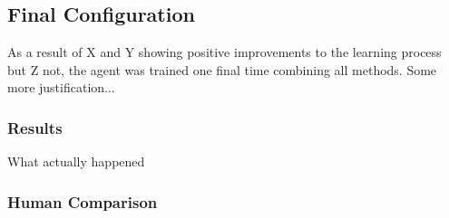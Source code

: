 
\subsection{Final Configuration}
\label{sec:findings-final}

As a result of X and Y showing positive improvements to the learning process
but Z not,
the agent was trained one final time combining all methods.
%
Some more justification...

\subsubsection{Results}

What actually happened

\subsubsection{Human Comparison}


